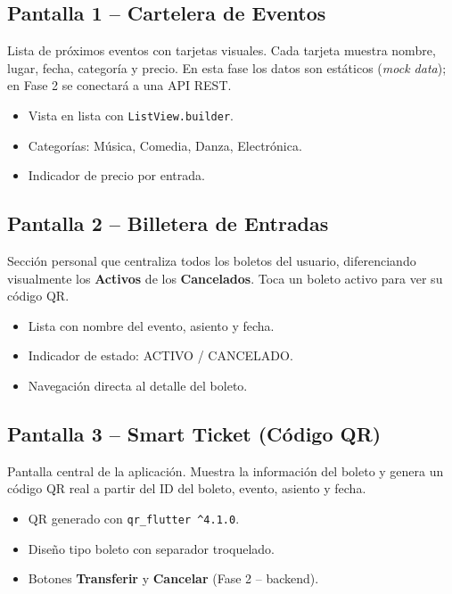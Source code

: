 \documentclass[12pt, letterpaper]{article}
\begin{document}
\subsection{Pantalla 1 -- Cartelera de Eventos}

Lista de próximos eventos con tarjetas visuales. Cada tarjeta muestra
nombre, lugar, fecha, categoría y precio. En esta fase los datos son
estáticos (\textit{mock data}); en Fase 2 se conectará a una API REST.

\begin{itemize}[noitemsep]
    \item Vista en lista con \texttt{ListView.builder}.
    \item Categorías: Música, Comedia, Danza, Electrónica.
    \item Indicador de precio por entrada.
\end{itemize}

\subsection{Pantalla 2 -- Billetera de Entradas}

Sección personal que centraliza todos los boletos del usuario,
diferenciando visualmente los \textbf{Activos} de los
\textbf{Cancelados}. Toca un boleto activo para ver su código QR.

\begin{itemize}[noitemsep]
    \item Lista con nombre del evento, asiento y fecha.
    \item Indicador de estado: ACTIVO / CANCELADO.
    \item Navegación directa al detalle del boleto.
\end{itemize}

\subsection{Pantalla 3 -- Smart Ticket (Código QR)}

Pantalla central de la aplicación. Muestra la información del boleto
y genera un código QR real a partir del ID del boleto, evento, asiento
y fecha.

\begin{itemize}[noitemsep]
    \item QR generado con \texttt{qr\_flutter \^{}4.1.0}.
    \item Diseño tipo boleto con separador troquelado.
    \item Botones \textbf{Transferir} y \textbf{Cancelar} (Fase 2 -- backend).
\end{itemize}
\end{document}
